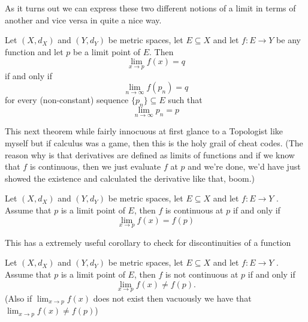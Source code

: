 	 \medskip
	 
	 As it turns out we can express these two different notions of a limit in terms of another and vice versa in quite a nice way.
	 
	 \medskip	 
	 
	 \begin{theorem}
	 	Let $(X, d_X)$ and $(Y, d_Y)$ be metric spaces, let $E \subseteq X$ and let $f : E \to Y$ be any function and let $p$ be a limit point of $E$. Then $$\lim_{x \to p} f(x) = q$$ if and only if $$\lim_{n \to \infty} f\left( p_n\right)  = q$$ for every (non-constant) sequence $\{p_n\} \subseteq E$ such that $$\lim_{n \to \infty} p_n = p$$
	 \end{theorem}
	 
	 
	 This next theorem while fairly innocuous at first glance to a Topologist like myself but if calculus was a game, then this is the holy grail of cheat codes. (The reason why is that derivatives are defined as limits of functions and if we know that $f$ is continuous, then we just evaluate $f$ at $p$ and we're done, we'd have just showed the existence and calculated the derivative like that, boom.)
	 
	 \begin{theorem}
	 	Let $(X, d_X)$ and $(Y, d_Y)$ be metric spaces, let $E \subseteq X$ and let $f : E \to Y$ . Assume that $p$ is a limit point of $E$, then $f$ is continuous at $p$ if and only if $$\lim_{x \to p} f(x) = f(p)$$
	 \end{theorem}
	 
	 This has a extremely useful corollary to check for discontinuities of a function
	 
	 \begin{corollary}
	 	Let $(X, d_X)$ and $(Y, d_Y)$ be metric spaces, let $E \subseteq X$ and let $f : E \to Y$ . Assume that $p$ is a limit point of $E$, then $f$ is not continuous at $p$ if and only if $$\lim_{x \to p} f(x) \neq f(p).$$ (Also if $ \lim_{x \to p} f(x)$ does not exist then vacuously we have that $\lim_{x \to p} f(x) \neq f(p)$)
	 \end{corollary}
	 
